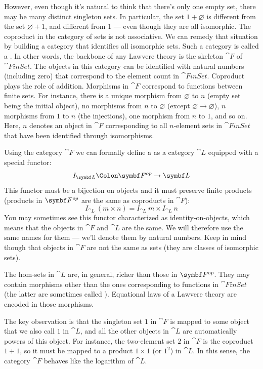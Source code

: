 However, even though it's natural to think that there's only one empty
set, there may be many distinct singleton sets. In particular, the set
$1 + \varnothing$ is different from the set $\varnothing + 1$, and
different from $1$ --- even though they are all isomorphic. The
coproduct in the category of sets is not associative. We can remedy that
situation by building a category that identifies all isomorphic sets.
Such a category is called a . In other words, the
backbone of any Lawvere theory is the skeleton $\cat{F}$ of
$\cat{FinSet}$. The objects in this category can be identified with
natural numbers (including zero) that correspond to the element count in
$\cat{FinSet}$. Coproduct plays the role of addition. Morphisms in
$\cat{F}$ correspond to functions between finite sets. For instance,
there is a unique morphism from $\varnothing$ to $n$ (empty set
being the initial object), no morphisms from $n$ to $\varnothing$
(except $\varnothing \to \varnothing$), $n$ morphisms from $1$ to
$n$ (the injections), one morphism from $n$ to $1$,
and so on. Here, $n$ denotes an object in $\cat{F}$
corresponding to all $n$-element sets in $\cat{FinSet}$ that have been
identified through isomorphisms.

Using the category $\cat{F}$ we can formally define a  as a category $\cat{L}$ equipped with a special functor:
\[I_{\cat{L}} \Colon \Fop \to \cat{L}\]
This functor must be a bijection on objects and it must preserve finite
products (products in $\Fop$ are the same as
coproducts in $\cat{F}$):
\[I_{\cat{L}}\ (m\times{}n) = I_{\cat{L}}\ m\times{}I_{\cat{L}}\ n\]
You may sometimes see this functor characterized as identity-on-objects,
which means that the objects in $\cat{F}$ and $\cat{L}$ are the same.
We will therefore use the same names for them --- we'll denote them by
natural numbers. Keep in mind though that objects in $\cat{F}$ are not
the same as sets (they are classes of isomorphic sets).

The hom-sets in $\cat{L}$ are, in general, richer than those in
$\Fop$. They may contain morphisms other than
the ones corresponding to functions in $\cat{FinSet}$ (the latter are
sometimes called ). Equational laws of a
Lawvere theory are encoded in those morphisms.

The key observation is that the singleton set $1$ in $\cat{F}$
is mapped to some object that we also call $1$ in $\cat{L}$, and
all the other objects in $\cat{L}$ are automatically powers of this
object. For instance, the two-element set $2$ in $\cat{F}$ is
the coproduct $1 + 1$, so it must be mapped to a product
$1 \times 1$ (or $1^2$) in $\cat{L}$. In this sense, the category
$\cat{F}$ behaves like the logarithm of $\cat{L}$.

